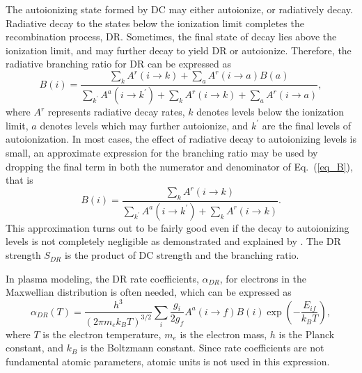 \documentclass[preprint, floatfix, pra, showpacs, showkeys]{revtex4}
\begin{document}
The autoionizing state formed by DC may either autoionize, or radiatively
decay. Radiative decay to the states below the ionization limit completes the
recombination process, DR. Sometimes, the final state of decay lies above the
ionization limit, and may further decay to yield DR or autoionize. Therefore,
the radiative branching ratio for DR can be expressed as
\begin{equation}
\label{eq_B}
B(i) = \frac{\sum_k A^r(i\to k) + \sum_a A^r(i\to a)B(a)}
{\sum_{k^\prime}A^a(i\to k^\prime) + \sum_k A^r(i\to k) + \sum_a A^r(i\to a)},
\end{equation}
where $A^r$ represents radiative decay rates, $k$ denotes levels below the
ionization limit, $a$ denotes levels which 
may further autoionize, and $k^\prime$ are the final levels of
autoionization. In most cases, the effect of radiative decay to autoionizing
levels is small, an approximate expression for the branching ratio may be used
by dropping the final term in both the numerator and denominator of
Eq.~(\ref{eq_B}), that is 
\begin{equation}
\label{eq_BApprox}B(i) = \frac{\sum_k A^r(i\to k)}
{\sum_{k^\prime}A^a(i\to k^\prime) + \sum_k A^r(i\to k)}.
\end{equation}
This approximation turns out to be fairly good even if the decay to
autoionizing levels is not completely negligible as demonstrated and explained
by \textcite{behar95, behar96}. The DR strength $S_{DR}$ is the product of DC
strength and the branching ratio.

In plasma modeling, the DR rate coefficients, $\alpha_{DR}$, for electrons in
the Maxwellian distribution is often needed, which can be expressed as
\begin{equation}
\label{eq_rate}
\alpha_{DR}(T) = \frac{h^3}{(2\pi m_e k_BT)^{3/2}}\sum_i\frac{g_i}{2g_f}
A^a(i\to f)B(i)\exp\left(-\frac{E_{if}}{k_BT}\right),
\end{equation}
where $T$ is the electron temperature, $m_e$ is the electron mass, $h$ is the
Planck constant, and $k_B$ is the Boltzmann constant. Since rate coefficients
are not fundamental atomic parameters, atomic units is not used in this
expression. 
\end{document}

